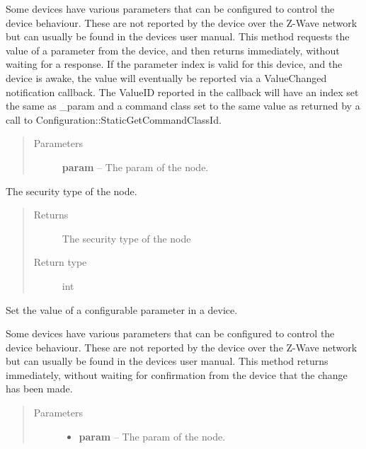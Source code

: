 \documentclass[letterpaper,10pt,english]{sphinxmanual}
\begin{document}
\begin{fulllineitems}
\begin{fulllineitems}
Some devices have various parameters that can be configured to control the
device behaviour.  These are not reported by the device over the Z-Wave network
but can usually be found in the devices user manual.  This method requests
the value of a parameter from the device, and then returns immediately,
without waiting for a response.  If the parameter index is valid for this
device, and the device is awake, the value will eventually be reported via a
ValueChanged notification callback.  The ValueID reported in the callback will
have an index set the same as \_param and a command class set to the same value
as returned by a call to Configuration::StaticGetCommandClassId.
\begin{quote}\begin{description}
\item[{Parameters}] \leavevmode
\textbf{param} -- The param of the node.

\end{description}\end{quote}

\end{fulllineitems}


\begin{fulllineitems}
\label{node:openzwave.node.ZWaveNode.security}
The security type of the node.
\begin{quote}\begin{description}
\item[{Returns}] \leavevmode
The security type of the node

\item[{Return type}] \leavevmode
int

\end{description}\end{quote}

\end{fulllineitems}


\begin{fulllineitems}
\label{node:openzwave.node.ZWaveNode.set_config_param}
Set the value of a configurable parameter in a device.

Some devices have various parameters that can be configured to control the
device behaviour.  These are not reported by the device over the Z-Wave network
but can usually be found in the devices user manual.  This method returns
immediately, without waiting for confirmation from the device that the change
has been made.
\begin{quote}\begin{description}
\item[{Parameters}] \leavevmode\begin{itemize}
\item {} 
\textbf{param} -- The param of the node.


\end{itemize}
\end{description}
\end{quote}
\end{fulllineitems}
\end{fulllineitems}
\end{document}
